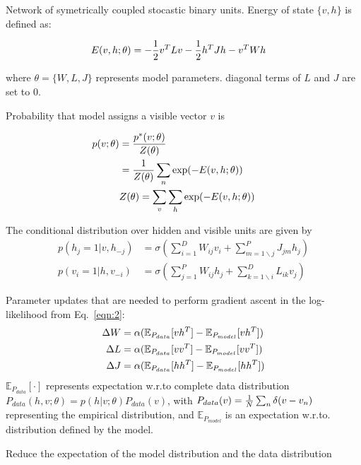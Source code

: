 \begin{slide}
Network of symetrically coupled stocastic binary units. 
Energy of state $\{v,h\}$ is defined as:
\begin{shaded}
\begin{align}
E(v,h;\theta) &= -{1 \over 2} v^TLv -{1\over 2} h^TJh - v^TWh
\end{align}
\end{shaded}
where $\theta = \{W,L,J\}$ represents model parameters. diagonal terms of $L$ and $J$ are set to 0. 
\end{slide}

\begin{slide}
Probability that model assigns a visible vector $v$ is
\begin{shaded}
\begin{align}
p(v;\theta) &= {p^*(v;\theta) \over Z(\theta)} \\&= {1 \over Z(\theta)} \sum_n\exp(-E(v,h;\theta))&&\label{eqn:2}\\
&Z(\theta) = \sum_v\sum_h\exp(-E(v,h;\theta))
\end{align}
\end{shaded}
\end{slide}

\begin{slide}
The conditional distribution over hidden and visible units are given by 
\begin{align*}
p(h_j=1|v,h_{-j}) &=\sigma\left(\sum_{i=1}^{D}W_{ij}v_i+\sum_{m=1\backslash j}^P J_{jm}h_j\right)\\
p(v_i=1|h,v_{-i}) &=\sigma\left(\sum_{j=1}^{P}W_{ij}h_j+\sum_{k=1\backslash i}^D L_{ik}v_j\right)
\end{align*}
\end{slide}


\begin{slide}
Parameter updates that are needed to perform gradient ascent in the log-likelihood from Eq.~\ref{eqn:2}:
\begin{align*}
\Delta W &= \alpha(\mathbb{E}_{P_{data}}[vh^T]-\mathbb{E}_{P_{model}}[vh^T])\\
\Delta L &= \alpha(\mathbb{E}_{P_{data}}[vv^T]-\mathbb{E}_{P_{model}}[vv^T])\\
\Delta J &= \alpha(\mathbb{E}_{P_{data}}[hh^T]-\mathbb{E}_{P_{model}}[hh^T])\\
\end{align*}
$\mathbb{E}_{P_{data}}[\cdot]$ represents expectation w.r.to complete data distribution $P_{data}(h,v;\theta)= p(h|v;\theta)P_{data}(v)$, with $P_{data}(v) = {1 \over N}\sum_n\delta(v-v_n)$ representing the empirical distribution, and $\mathbb{E}_{P_{model}}$ is an expectation w.r.to. distribution defined by the model.
\begin{shaded}
\centering{}Reduce the expectation of the model distribution and the data distribution
\end{shaded}
\end{slide}


